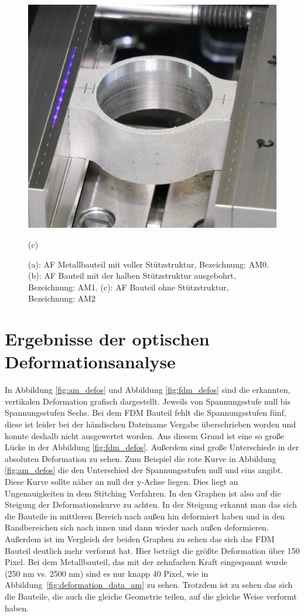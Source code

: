 \begin{figure}[H]
\begin{minipage}{.33\textwidth}
        \centering
        \includegraphics[width=0.9\linewidth]{images/AM2_crop.JPG}
        \caption*{(c)}
      \end{minipage}
      \caption{(a): AF Metallbauteil mit voller Stützstruktur, Bezeichnung: AM0.
      (b): AF Bauteil mit der halben Stützstruktur ausgebohrt, Bezeichnung: AM1.
      (c): AF Bauteil ohne Stützstruktur, Bezeichnung: AM2}
      \label{fig:am_parts}
\end{figure}

\section{Ergebnisse der optischen Deformationsanalyse}

In Abbildung \ref{fig:am_defos} und Abbildung \ref{fig:fdm_defos} sind die erkannten,
vertikalen Deformation grafisch dargestellt. Jeweils von Spannungsstufe null bis 
Spannungsstufen Sechs. Bei dem FDM Bauteil fehlt die Spannungsstufen fünf, 
diese ist leider bei der händischen Dateiname Vergabe überschrieben worden und konnte 
deshalb nicht ausgewertet worden. Aus diesem Grund ist eine so große Lücke in der 
Abbildung \ref{fig:fdm_defos}.
Außerdem sind große Unterschiede in der absoluten Deformation zu sehen. Zum Beispiel 
die rote Kurve in Abbildung \ref{fig:am_defos} die den Unterschied der Spannungsstufen 
null und eins angibt. Diese Kurve sollte näher an null der y-Achse liegen. 
Dies liegt an Ungenauigkeiten in dem Stitching Verfahren. In den Graphen ist also 
auf die Steigung der Deformationskurve zu achten. In der Steigung erkannt man das 
sich die Bauteile in mittleren Bereich nach außen hin deformiert haben und in 
den Randbereichen sich nach innen und dann wieder nach außen deformieren.
Außerdem ist im Vergleich der beiden Graphen zu sehen das sich das FDM Bauteil deutlich 
mehr verformt hat. Hier beträgt die größte Deformation über 150 Pixel.
Bei dem Metallbauteil, das mit der zehnfachen Kraft eingespannt wurde (250 nm vs. 2500 nm)
sind es nur knapp 40 Pixel, wie in Abbildung~\ref{fig:deformation_data_am} zu sehen. Trotzdem ist zu sehen das sich die Bauteile, die auch die 
gleiche Geometrie teilen, auf die gleiche Weise verformt haben.

